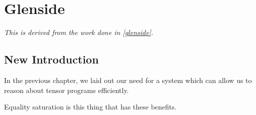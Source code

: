 





\chapter{Glenside}
\label{sec:part1-glenside}

\textit{This is derived from the work done in \ref{glenside}.}

\section{New Introduction}

In the previous chapter,
  we laid out our need
  for a system
  which can allow us
  to reason about tensor programs efficiently.

Equality saturation is this thing
  that has these benefits.

